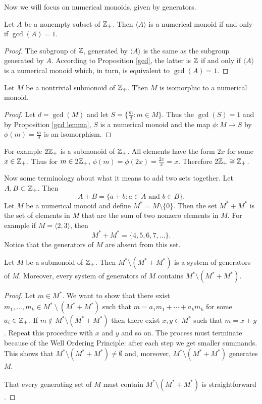 Now we will focus on numerical monoids, given by generators. 

\begin{proposition}\label{gcd lemma}
Let $A$ be a nonempty subset of $\mathbb{Z}_+$. Then $\langle A \rangle$ is a numerical monoid if and only if $\gcd(A) = 1$.
\end{proposition}

\begin{proof}
The subgroup of $\mathbb Z$, generated by $\langle A \rangle$ is the  same as the subgroup generated by $A$. According to Proposition \ref{gcd}, the latter is $\mathbb{Z}$ if and only if $\langle A \rangle$ is a numerical monoid which, in turn, is equivalent to $\gcd(A) = 1$.
\end{proof}


\begin{proposition}
Let $M$ be a nontrivial submonoid of $\mathbb{Z}_+$. Then $M$ is isomorphic to a numerical monoid.
\end{proposition}

\begin{proof}
Let $d = \gcd(M)$ and let $S = \{ \frac{m}{d} : m \in M\}$. Thus the $\gcd(S) = 1$ and by Proposition \ref{gcd lemma}, $S$ is a numerical monoid and the map $\phi: M \rightarrow S$ by $\phi(m) = \frac{m}{d}$ is an isomorphism.
\end{proof}

For example $2\mathbb{Z}_+$ is a submonoid of $\mathbb{Z}_+$. All elements have the form $2x$ for some $x \in \mathbb{Z}_+$. Thus for $m \in 2\mathbb{Z}_+$, $\phi(m) = \phi(2x) = \frac{2x}{x} = x$. Therefore $2\mathbb{Z}_+ \cong \mathbb{Z}_+$.

Now some terminology about what it means to add two sets together. Let $A, B \subset \mathbb{Z}_+$. Then 
\[
  A + B = \{a + b: a \in A \text{ and } b \in B\}.
\]
Let $M$ be a numerical monoid and define $M^* = M \setminus \{0\}$. Then the set $M^* + M^*$ is the set of elements in $M$ that are the sum of two nonzero elements in $M$. For example if $M = \langle 2,3 \rangle$, then
\[
  M^* + M^* = \{4, 5, 6, 7, \ldots \}.
\]
Notice that the generators of $M$ are absent from this set.

\begin{lemma}\label{system of generators}
Let $M$ be a submonoid of $\mathbb{Z}_+$. Then $M^* \setminus (M^* + M^*)$ is a system of generators of $M$. Moreover, every system of generators of $M$ contains $M^* \setminus (M^* + M^*)$.
\end{lemma}

\begin{proof}
Let $m \in M^*$. We want to show that there exist $m_1, \ldots, m_k \in M^*~\setminus~(M^* + M^*)$ such that $m = a_1m_1 + \cdots + a_km_k$ for some $a_i \in \mathbb{Z}_+$. If $m \notin M^* \setminus (M^* + M^*)$ then there exist $x, y \in M^*$ such that $m = x + y$. Repeat this procedure with $x$ and $y$ and so on. The process must terminate because of the Well Ordering Principle: after each step we get smaller summands. This shows that $M^* \setminus (M^* + M^*) \not = \emptyset$ and, moreover, $M^* \setminus (M^* + M^*)$ generates $M$.

That every generating set of $M$ must contain $M^* \setminus (M^* + M^*)$ is straightforward \cite[Chapter 2.A]{Kripo}. 
\end{proof}

